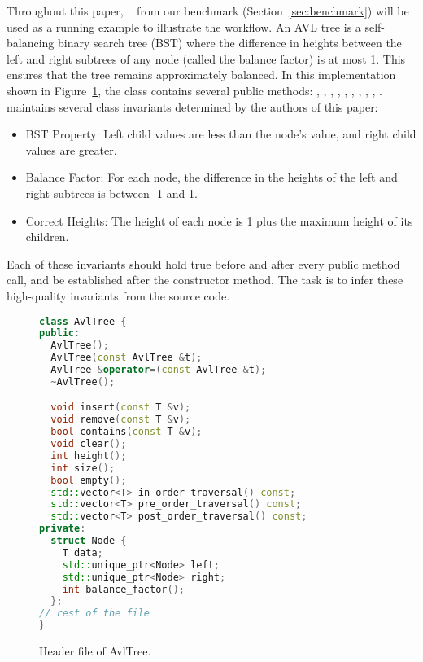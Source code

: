 
Throughout this paper, ~\cite{avltree,cpp_ds} from our benchmark (Section~\ref{sec:benchmark}) will be used as a running example to illustrate the workflow. An AVL tree is a self-balancing binary search tree (BST) where the difference in heights between the left and right subtrees of any node (called the balance factor) is at most 1. This ensures that the tree remains approximately balanced. In this implementation shown in Figure~\ref{fig:avl_header}, the  class contains several public methods: , , , , , , , , , .  maintains several class invariants determined by the authors of this paper: 
\begin{itemize}
    \item BST Property: Left child values are less than the node's value, and right child values are greater.
    \item Balance Factor: For each node, the difference in the heights of the left and right subtrees is between -1 and 1.
    \item Correct Heights: The height of each node is 1 plus the maximum height of its children.
\end{itemize}

Each of these invariants should hold true before and after every public method call, and be established after the constructor method. The task is to infer these high-quality invariants from the source code.

\begin{figure}[htp]
    \centering
\begin{lstlisting}[language=c++, escapechar=!]
class AvlTree {
public:
  AvlTree();
  AvlTree(const AvlTree &t);
  AvlTree &operator=(const AvlTree &t);
  ~AvlTree();

  void insert(const T &v);
  void remove(const T &v);
  bool contains(const T &v);
  void clear();
  int height();
  int size();
  bool empty();
  std::vector<T> in_order_traversal() const;
  std::vector<T> pre_order_traversal() const;
  std::vector<T> post_order_traversal() const;
private:
  struct Node {
    T data;
    std::unique_ptr<Node> left;
    std::unique_ptr<Node> right;
    int balance_factor();
  };
// rest of the file
}
\end{lstlisting}
    \caption{Header file of AvlTree.}
    \label{fig:avl_header}
\end{figure}

